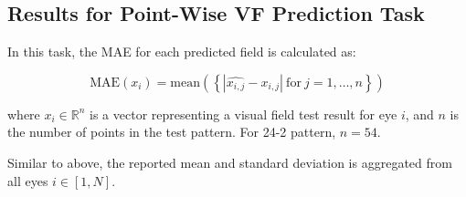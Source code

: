 \subsection{Results for Point-Wise \ac{VF} Prediction Task}

In this task, the \ac{MAE} for each predicted field is calculated as:

\begin{equation}
\textrm{MAE}(x_i)=\textrm{mean}(\left\{\left| \hat{x_{i,j}} - x_{i,j} \right|\ \textrm{for}\ j = 1,\ldots,n\right\})
\end{equation}

where $x_i\in\mathbb{R}^{n}$ is a vector representing a visual field test result for eye $i$, and $n$ is the number of points in the test pattern. For 24-2 pattern, $n=54$.

Similar to above, the reported mean and standard deviation is aggregated from all eyes $i\in \left[ 1,N \right]$.

